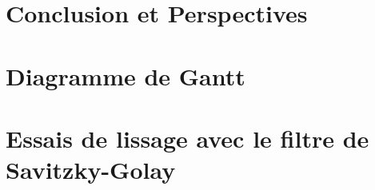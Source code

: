 \documentclass[a4paper,12pt,oneside,chapterprefix=true]{scrbook}
\begin{document}
  
  
  \chapter{Conclusion et Perspectives}
  
  
  
\appendix

\chapter{Diagramme de Gantt}\label{annexe-a}
\chapter{Essais de lissage avec le filtre de Savitzky-Golay}\label{annexe-b}
 

\backmatter

\printglossary[type=\acronymtype]

\cleardoublepage
{}


  
\end{document}
